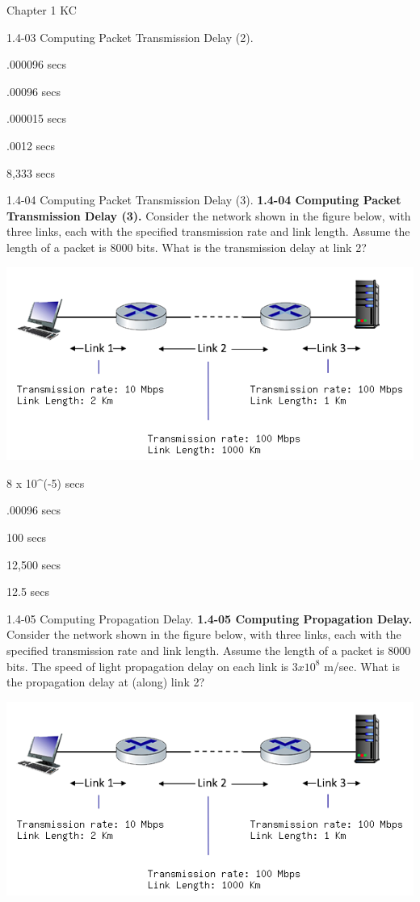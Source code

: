 \documentclass[a4paper]{article}
\begin{document}
\begin{quiz}{Chapter 1 KC}
\begin{multi}[points=1]{1.4-03 Computing Packet Transmission Delay (2).}
\item* .000096 secs
\item .00096 secs
\item .000015 secs
\item .0012 secs
\item 8,333 secs
\end{multi}

\begin{multi}[points=1]{1.4-04 Computing Packet Transmission Delay (3).}
\textbf{1.4-04 Computing Packet Transmission Delay (3).} 
Consider the network shown in the figure below, with three links, each with the specified transmission rate and link length. Assume the length of a packet is 8000 bits. What is the transmission delay at link 2? 
\begin{center}
\includegraphics[width=\linewidth]{figs/1.4.4.png}
\end{center}

\item* 8 x 10^(-5) secs
\item .00096 secs
\item 100 secs
\item 12,500 secs
\item 12.5 secs
\end{multi}

\begin{multi}[points=1]{1.4-05 Computing Propagation Delay.}
\textbf{1.4-05 Computing Propagation Delay.} 
Consider the network shown in the figure below, with three links, each with the specified transmission rate and link length. Assume the length of a packet is 8000 bits. The speed of light propagation delay on each link is $3x10^8$ m/sec.
What is the propagation delay at (along) link 2? 
\begin{center}
\includegraphics[width=\linewidth]{figs/1.4.4.png}
\end{center}


\end{multi}
\end{quiz}
\end{document}
